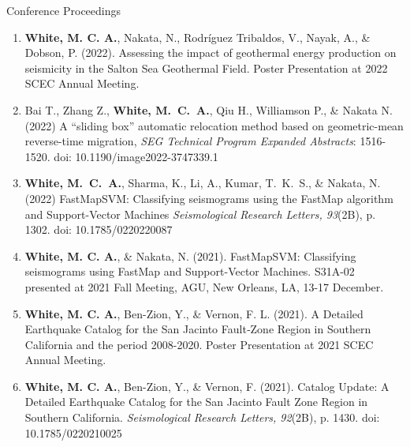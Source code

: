 \begin{rSection}{Conference Proceedings}
	\begin{enumerate}
		
		\item \textbf{White, M. C. A.}, Nakata, N., Rodríguez Tribaldos, V., Nayak, A., \& Dobson, P. (2022). Assessing the impact of geothermal energy production on seismicity in the Salton Sea Geothermal Field. Poster Presentation at 2022 SCEC Annual Meeting.
		
		\item Bai T., Zhang Z., \textbf{White, M.~C.~A.}, Qiu H., Williamson P., \& Nakata N. (2022) A ``sliding box'' automatic relocation method based on geometric-mean reverse-time migration, \textit{SEG Technical Program Expanded Abstracts}: 1516-1520.
		doi: 10.1190/image2022-3747339.1
		
		\item \textbf{White, M.~C.~A.}, Sharma, K., Li, A., Kumar, T.~K.~S., \& Nakata, N. (2022) FastMapSVM: Classifying seismograms using the FastMap algorithm and Support-Vector Machines \textit{Seismological Research Letters, 93}(2B), p. 1302. doi: 10.1785/0220220087
			
		\item \textbf{White, M. C. A.},  \& Nakata, N. (2021). FastMapSVM: Classifying seismograms using FastMap and Support-Vector Machines. S31A-02 presented at 2021 Fall Meeting, AGU, New Orleans, LA, 13-17 December.
		
		\item \textbf{White, M. C. A.}, Ben-Zion, Y., \& Vernon, F. L. (2021). A Detailed Earthquake Catalog for the San Jacinto Fault‐Zone Region in Southern California and the period 2008-2020. Poster Presentation at 2021 SCEC Annual Meeting.

		\item \textbf{White, M. C. A.}, Ben-Zion, Y., \& Vernon, F. (2021). Catalog Update: A Detailed Earthquake Catalog for the San Jacinto Fault Zone Region in Southern California.  \textit{Seismological Research Letters, 92}(2B), p. 1430. doi: 10.1785/0220210025


\end{enumerate}
\end{rSection}
